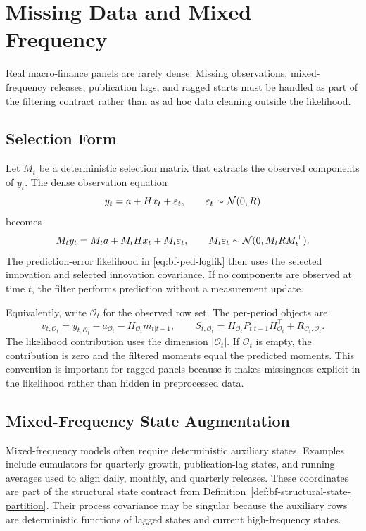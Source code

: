 \chapter{Missing Data and Mixed Frequency}
\label{ch:bf-missing-data-mixed-frequency}

Real macro-finance panels are rarely dense.  Missing observations,
mixed-frequency releases, publication lags, and ragged starts must be handled
as part of the filtering contract rather than as ad hoc data cleaning outside
the likelihood.

\section{Selection Form}
\label{sec:bf-missing-selection-form}

Let $M_t$ be a deterministic selection matrix that extracts the observed
components of $y_t$.  The dense observation equation
\[
  y_t=a+Hx_t+\varepsilon_t,\qquad \varepsilon_t\sim\mathcal{N}(0,R)
\]
becomes
\[
  M_ty_t = M_ta + M_tHx_t + M_t\varepsilon_t,
  \qquad
  M_t\varepsilon_t\sim\mathcal{N}(0,M_tRM_t^\top).
\]
The prediction-error likelihood in \eqref{eq:bf-ped-loglik} then uses the
selected innovation and selected innovation covariance.  If no components are
observed at time $t$, the filter performs prediction without a measurement
update.

Equivalently, write $\mathcal{O}_t$ for the observed row set.  The per-period
objects are
\[
  v_{t,\mathcal{O}_t}=y_{t,\mathcal{O}_t}-a_{\mathcal{O}_t}
    -H_{\mathcal{O}_t}m_{t|t-1},
  \qquad
  S_{t,\mathcal{O}_t}
    =H_{\mathcal{O}_t}P_{t|t-1}H_{\mathcal{O}_t}^\top
      +R_{\mathcal{O}_t,\mathcal{O}_t}.
\]
The likelihood contribution uses the dimension
$|\mathcal{O}_t|$.  If $\mathcal{O}_t$ is empty, the contribution is zero and
the filtered moments equal the predicted moments.  This convention is important
for ragged panels because it makes missingness explicit in the likelihood
rather than hidden in preprocessed data.

\section{Mixed-Frequency State Augmentation}
\label{sec:bf-mixed-frequency-state-augmentation}

Mixed-frequency models often require deterministic auxiliary states.  Examples
include cumulators for quarterly growth, publication-lag states, and running
averages used to align daily, monthly, and quarterly releases.  These
coordinates are part of the structural state contract from
Definition~\ref{def:bf-structural-state-partition}.  Their process covariance
may be singular because the auxiliary rows are deterministic functions of
lagged states and current high-frequency states.

